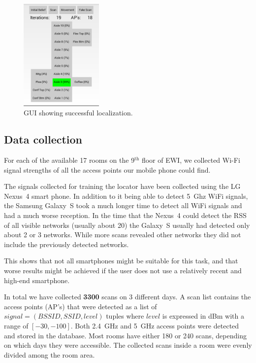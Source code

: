 \documentclass[a4paper,10pt,twoside]{IEEEtran}
\begin{document}
\begin{figure}
  \centering
    \includegraphics[width=0.36\textwidth]{screenshot}
    \caption{GUI showing successful localization.}
    \label{fig:screenshot}
\end{figure}

\subsection{Data collection}
\label{sec:loc-localization-method}
For each of the available 17 rooms on the 9$^{\text{th}}$ floor of EWI, we collected Wi-Fi signal strengths of all the access points our mobile phone could find.

The signals collected for training the locator have been collected using the LG Nexus~4 smart phone.
In addition to it being able to detect 5~Ghz WiFi signals, the Samsung Galaxy~S took a much longer time to detect all WiFi signals and had a much worse reception.
In the time that the Nexus~4 could detect the RSS of all visible networks (usually about 20) the Galaxy~S usually had detected only about 2 or 3 networks. While more scans revealed other networks they did not include the previously detected networks.
  
This shows that not all smartphones might be suitable for this task, and that worse results might be achieved if the user does not use a relatively recent and high-end smartphone.

In total we have collected \textbf{3300} scans on 3 different days.
A scan list contains the access points (AP's) that were detected as a list of $signal = (BSSID, SSID, level)$ tuples where $level$ is expressed in dBm with a range of $[-30,-100]$.
Both 2.4~GHz and 5~GHz access points were detected and stored in the database.
Most rooms have either 180 or 240 scans, depending on which days they were accessible.
The collected scans inside a room were evenly divided among the room area.
\end{document}

